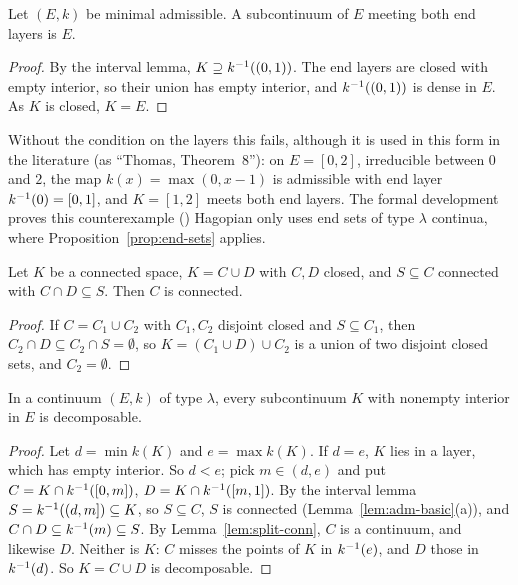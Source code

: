 \begin{proposition}\label{prop:end-sets}
Let $(E,k)$ be minimal admissible. A subcontinuum of $E$ meeting both end layers is $E$.
\end{proposition}

\begin{proof}
By the interval lemma, $K\supseteq k^{-1}((0,1))$. The end layers are closed with empty interior, so their
union has empty interior, and $k^{-1}((0,1))$ is dense in $E$. As $K$ is closed, $K=E$.
\end{proof}


\begin{remark}\label{rem:end-sets-false}
Without the condition on the layers this fails, although it is used in this form in the literature (as
``Thomas, Theorem~8''): on $E=[0,2]$, irreducible between $0$ and $2$, the map $k(x)=\max(0,x-1)$ is
admissible with end layer $k^{-1}(0)=[0,1]$, and $K=[1,2]$ meets both end layers. The formal development
proves this counterexample () Hagopian only uses
end sets of type $\lambda$ continua, where Proposition~\ref{prop:end-sets} applies.
\end{remark}

\begin{lemma}\label{lem:split-conn}
Let $K$ be a connected space, $K=C\cup D$ with $C,D$ closed, and $S\subseteq C$ connected with $C\cap D\subseteq S$.
Then $C$ is connected.
\end{lemma}

\begin{proof}
If $C=C_1\cup C_2$ with $C_1,C_2$ disjoint closed and $S\subseteq C_1$, then $C_2\cap D\subseteq C_2\cap S=\emptyset$, so
$K=(C_1\cup D)\cup C_2$ is a union of two disjoint closed sets, and $C_2=\emptyset$.
\end{proof}


\begin{proposition}\label{prop:lemma2-nec}
In a continuum $(E,k)$ of type $\lambda$, every subcontinuum $K$ with nonempty interior in $E$ is decomposable.
\end{proposition}

\begin{proof}
Let $d=\min k(K)$ and $e=\max k(K)$. If $d=e$, $K$ lies in a layer, which has empty interior. So $d<e$; pick
$m\in(d,e)$ and put $C=K\cap k^{-1}([0,m])$, $D=K\cap k^{-1}([m,1])$. By the interval lemma
$S=k^{-1}((d,m])\subseteq K$, so $S\subseteq C$, $S$ is connected (Lemma~\ref{lem:adm-basic}(a)), and $C\cap
D\subseteq k^{-1}(m)\subseteq S$. By Lemma~\ref{lem:split-conn}, $C$ is a continuum, and likewise $D$. Neither is $K$: $C$
misses the points of $K$ in $k^{-1}(e)$, and $D$ those in $k^{-1}(d)$. So $K=C\cup D$ is decomposable.
\end{proof}

